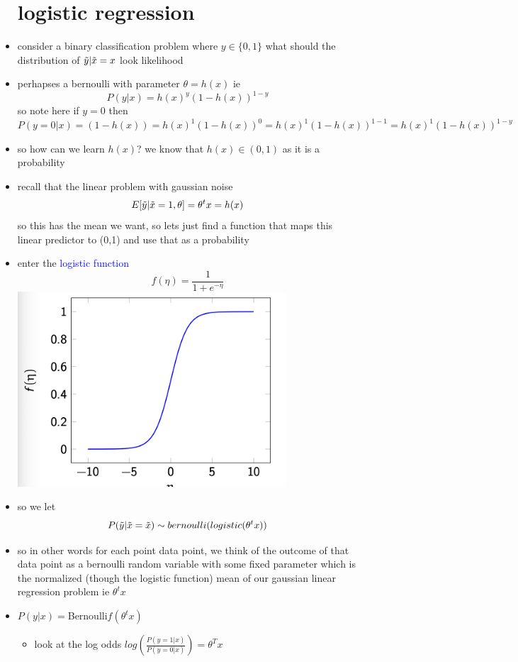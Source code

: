 \documentclass{article}
\begin{document}
\begin{itemize}
\section*{logistic regression}
\item consider a binary classification problem where $y\in \{0,1\}$ what should the distribution of $\Tilde{y}|\Tilde{x}=x$ look likelihood
\item perhapses a bernoulli with parameter $\theta=h(x)$ ie  $$P(y|x)=h(x)^{y}(1-h(x))^{1-y}$$ so note here if $y=0$ then $P(y=0|x)=(1-h(x))=h(x)^{1}(1-h(x))^{0}=h(x)^{1}(1-h(x))^{1-1}=h(x)^{1}(1-h(x))^{1-y}$
\item so how can we learn $h(x)$? we know that $h(x)\in (0,1)$ as it is a probability
\item recall that the linear problem with gaussian noise $$E[\tilde{y}|\Tilde{x}=1, \theta]=\theta^{t}x=h(x)$$ so this has the mean we want, so lets just find a function that maps this linear predictor to (0,1) and use that as a probability
\item enter the \textcolor{blue}{logistic function} $$f(\eta)=\frac{1}{1+e^{-\eta}}$$ \includegraphics*[width=10cm]{images/Screenshot 2023-05-13 at 5.20.46 PM.png}
\item so we let $$P(\Tilde{y}|\Tilde{x}=\Tilde{x})\sim bernoulli(logistic(\theta^{t}x))$$ 
\item so in other words for each point data point, we think of the outcome of that data point as a bernoulli random variable with some fixed parameter which is the normalized (though the logistic function) mean of our gaussian linear regression problem ie $\theta^{t}x$
\item  $P(y|x)=$Bernoulli$f(\theta^tx)$
\begin{itemize}
    \item look at the log odds $log(\frac{P(y=1|x)}{P(y=0|x)})=\theta^Tx$ 

\end{itemize}
\end{itemize}
\end{document}
